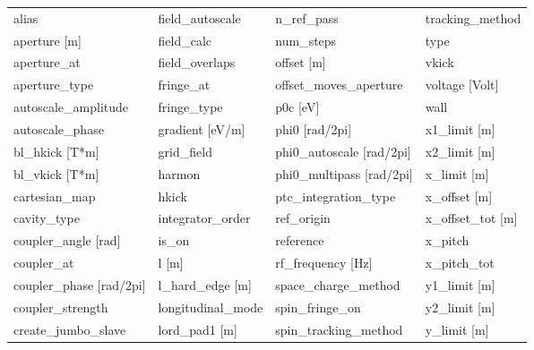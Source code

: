  \begin{tabular}{llll} \toprule
alias                          & field_autoscale                & n_ref_pass                     & tracking_method                \\
aperture [m]                   & field_calc                     & num_steps                      & type                           \\
aperture_at                    & field_overlaps                 & offset [m]                     & vkick                          \\
aperture_type                  & fringe_at                      & offset_moves_aperture          & voltage [Volt]                 \\
autoscale_amplitude            & fringe_type                    & p0c [eV]                       & wall                           \\
autoscale_phase                & gradient [eV/m]                & phi0 [rad/2pi]                 & x1_limit [m]                   \\
bl_hkick [T*m]                 & grid_field                     & phi0_autoscale [rad/2pi]       & x2_limit [m]                   \\
bl_vkick [T*m]                 & harmon                         & phi0_multipass [rad/2pi]       & x_limit [m]                    \\
cartesian_map                  & hkick                          & ptc_integration_type           & x_offset [m]                   \\
cavity_type                    & integrator_order               & ref_origin                     & x_offset_tot [m]               \\
coupler_angle [rad]            & is_on                          & reference                      & x_pitch                        \\
coupler_at                     & l [m]                          & rf_frequency [Hz]              & x_pitch_tot                    \\
coupler_phase [rad/2pi]        & l_hard_edge [m]                & space_charge_method            & y1_limit [m]                   \\
coupler_strength               & longitudinal_mode              & spin_fringe_on                 & y2_limit [m]                   \\
create_jumbo_slave             & lord_pad1 [m]                  & spin_tracking_method           & y_limit [m]                    \\

\end{tabular}
